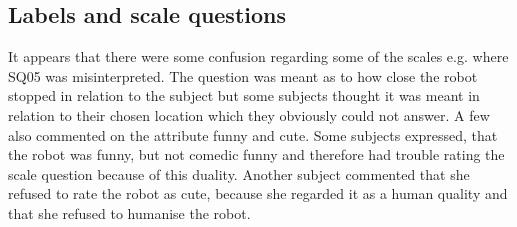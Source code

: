 \subsection{Labels and scale questions}
%
It appears that there were some confusion regarding some of the scales e.g. where SQ05 was misinterpreted. The question was meant as to how close the robot stopped in relation to the subject but some subjects thought it was meant in relation to their chosen location which they obviously could not answer. A few also commented on the attribute funny and cute. Some subjects expressed, that the robot was funny, but not comedic funny and therefore had trouble rating the scale question because of this duality. Another subject commented that she refused to rate the robot as cute, because she regarded it as a human quality and that she refused to humanise the robot.
